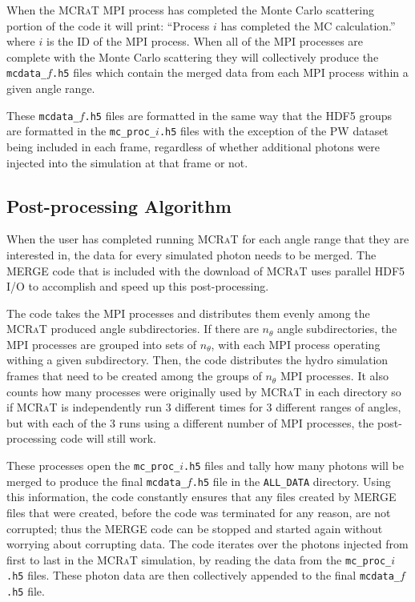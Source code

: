 \documentclass[12pt,a4paper]{article}
\newcommand{\mcrat}{\textsc{MCRaT}}
\begin{document}
When the \mcrat{} MPI process has completed the Monte Carlo scattering portion of the code it will print: ``Process $i$ has completed the MC calculation.'' where $i$ is the ID of the MPI process. When all of the MPI processes are complete with the Monte Carlo scattering they will collectively produce the \texttt{mcdata\_$f$.h5} files which contain the merged data from each MPI process within a given angle range.

These \texttt{mcdata\_$f$.h5} files are formatted in the same way that the HDF5 groups are formatted in the \texttt{mc\_proc\_$i$.h5} files with the exception of the PW dataset being included in each frame, regardless of whether additional photons were injected into the simulation at that frame or not. 

\subsection{Post-processing Algorithm}
When the user has completed running \mcrat{} for each angle range that they are interested in, the data for every simulated photon needs to be merged. The MERGE code that is included with the download of \mcrat{} uses parallel HDF5 I/O to accomplish and speed up this post-processing. 

The code takes the MPI processes and distributes them evenly among the \mcrat{} produced angle subdirectories. If there are $n_\theta$ angle subdirectories, the MPI processes are grouped into sets of $n_\theta$, with each MPI process operating withing a given subdirectory. Then, the code distributes the hydro simulation frames that need to be created among the groups of $n_\theta$ MPI processes. It also counts how many processes were originally used by \mcrat{} in each directory so if \mcrat{} is independently run 3 different times for 3 different ranges of angles, but with each of the 3 runs using a different number of MPI processes, the post-processing code will still work.

These processes open the \texttt{mc\_proc\_$i$.h5} files and tally how many photons will be merged to produce the final \texttt{mcdata\_$f$.h5} file in the \texttt{ALL\_DATA} directory. Using this information, the code constantly ensures that any files created by MERGE files that were created, before the code was terminated for any reason, are not corrupted; thus the MERGE code can be stopped and started again without worrying about corrupting data. The code iterates over the photons injected from first to last in the \mcrat{} simulation, by reading the data from the \texttt{mc\_proc\_$i$.h5} files. These photon data are then collectively appended to the final \texttt{mcdata\_$f$.h5} file. 
\end{document}
